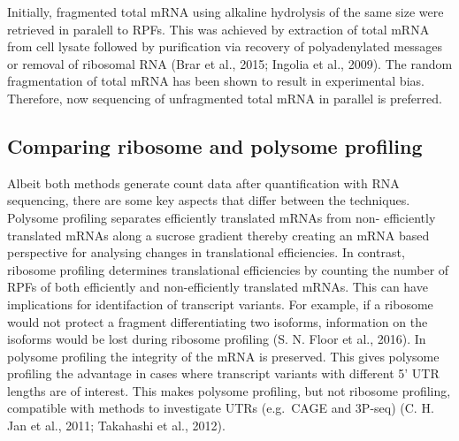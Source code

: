 \documentclass[12pt,openany]{book}
\begin{document}
Initially, fragmented total mRNA using alkaline hydrolysis of the same
size were retrieved in paralell to RPFs. This was achieved by extraction
of total mRNA from cell lysate followed by purification via recovery of
polyadenylated messages or removal of ribosomal RNA (Brar et al., 2015;
Ingolia et al., 2009). The random fragmentation of total mRNA has been
shown to result in experimental bias. Therefore, now sequencing of
unfragmented total mRNA in parallel is preferred.

\subsection{Comparing ribosome and polysome profiling}

Albeit both methods generate count data after quantification with RNA
sequencing, there are some key aspects that differ between the
techniques. Polysome profiling separates efficiently translated mRNAs
from non- efficiently translated mRNAs along a sucrose gradient thereby
creating an mRNA based perspective for analysing changes in
translational efficiencies. In contrast, ribosome profiling determines
translational efficiencies by counting the number of RPFs of both
efficiently and non-efficiently translated mRNAs. This can have
implications for identifaction of transcript variants. For example, if a
ribosome would not protect a fragment differentiating two isoforms,
information on the isoforms would be lost during ribosome profiling (S.
N. Floor et al., 2016). In polysome profiling the integrity of the mRNA
is preserved. This gives polysome profiling the advantage in cases where
transcript variants with different 5' UTR lengths are of interest. This
makes polysome profiling, but not ribosome profiling, compatible with
methods to investigate UTRs (e.g.~CAGE and 3P-seq) (C. H. Jan et al.,
2011; Takahashi et al., 2012).
\end{document}
